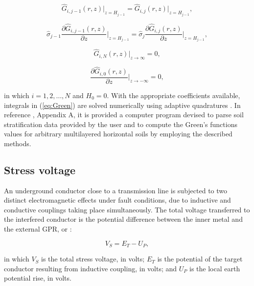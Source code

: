 \documentclass{IEEEtran4PSCC}
\begin{document}
\begin{equation}
	\hat{G}_{i,j-1}(r,z)\vert_{z = H_{j - 1}} = \hat{G}_{i,j}(r,z)\vert_{z = H_{j-1}},
\end{equation}

\begin{equation}
	\hat\sigma_{j-1}\frac{\partial \hat{G}_{i,j-1}(r,z)}{\partial z}\bigg\vert_{z = H_{j-1}} = \hat\sigma_{j}\frac{\partial \hat{G}_{i,j}(r,z)}{\partial z}\bigg\vert_{z = H_{j-1}},
\end{equation}

\begin{equation}
	\hat{G}_{i,N}(r,z)\vert_{z\rightarrow \infty} = 0,
\end{equation}

\begin{equation}
	\frac{\partial \hat{G}_{i,0}(r,z)}{\partial z}\bigg\vert_{z\rightarrow -\infty} = 0,
\end{equation}

\noindent in which $i=1,2,\dots,N$ and $H_{0} = 0$. With the appropriate coefficients available, integrals in (\ref{eq:Green}) are solved numerically using adaptive quadratures \cite{Shampine2008}. In reference \cite{Martins-Britto2020}, Appendix A, it is provided a computer program devised to parse soil stratification data provided by the user and to compute the Green's functions values for arbitrary multilayered horizontal soils by employing the described methods. 

\subsection{Stress voltage}

An underground conductor close to a transmission line is subjected to two distinct electromagnetic effects under fault conditions, due to inductive and conductive couplings taking place simultaneously. The total voltage transferred to the interfered conductor is the potential difference between the inner metal and the external GPR, or \cite{IEEEStd80}:

\begin{equation} \label{eq:Vs}
	V_{S} = E_{T} - U_{P},
\end{equation}  

\noindent in which $V_{S}$ is the total stress voltage, in volts; $E_{T}$ is the potential of the target conductor resulting from inductive coupling, in volts; and $U_{P}$ is the local earth potential rise, in volts.
\end{document}
